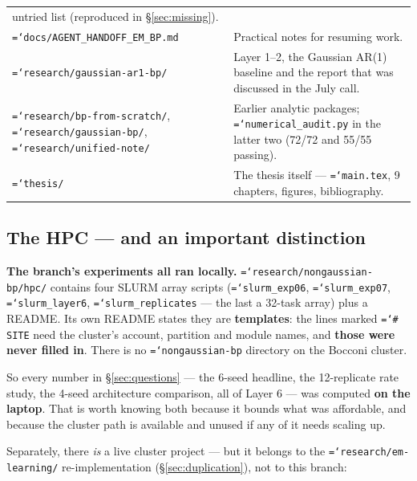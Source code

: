 \documentclass[11pt,a4paper]{article}
\newcommand{\code}[1]{\texttt{\small\hyphenchar\font=`\-\relax #1}}
\begin{document}
\begin{center}
\begin{tabular}{@{}p{6.4cm}p{8.8cm}@{}}
untried list (reproduced in \S\ref{sec:missing}). \\
\code{docs/AGENT\_HANDOFF\_EM\_BP.md} & Practical notes for resuming work. \\
\midrule
\code{research/gaussian-ar1-bp/} & Layer 1--2, the Gaussian AR(1) baseline and the report
that was discussed in the July call. \\
\code{research/bp-from-scratch/}, \code{research/gaussian-bp/},
\code{research/unified-note/} & Earlier analytic packages; \code{numerical\_audit.py} in
the latter two (72/72 and 55/55 passing). \\
\code{thesis/} & The thesis itself --- \code{main.tex}, 9 chapters, figures, bibliography. \\
\bottomrule
\end{tabular}
\end{center}

\subsection{The HPC --- and an important distinction}
\label{sec:hpc}

\begin{keybox}
\textbf{The branch's experiments all ran locally.} \code{research/nongaussian-bp/hpc/}
contains four SLURM array scripts (\code{slurm\_exp06}, \code{slurm\_exp07},
\code{slurm\_layer6}, \code{slurm\_replicates} --- the last a 32-task array) plus a README.
Its own README states they are \textbf{templates}: the lines marked \code{\# SITE} need the
cluster's account, partition and module names, and \textbf{those were never filled in}.
There is no \code{nongaussian-bp} directory on the Bocconi cluster.

\medskip
So every number in \S\ref{sec:questions} --- the 6-seed headline, the 12-replicate rate
study, the 4-seed architecture comparison, all of Layer 6 --- was computed \textbf{on the
laptop}. That is worth knowing both because it bounds what was affordable, and because the
cluster path is available and unused if any of it needs scaling up.
\end{keybox}

\noindent
Separately, there \emph{is} a live cluster project --- but it belongs to the
\code{research/em-learning/} re-implementation (\S\ref{sec:duplication}), not to this
branch:
\end{document}

